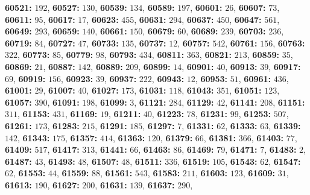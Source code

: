 \textsf{\bfseries 60521:} $192$, \textsf{\bfseries 60527:} $130$, \textsf{\bfseries 60539:} $134$, \textsf{\bfseries 60589:} $197$, \textsf{\bfseries 60601:} $26$, \textsf{\bfseries 60607:} $73$, \textsf{\bfseries 60611:} $95$, \textsf{\bfseries 60617:} $17$, \textsf{\bfseries 60623:} $455$, \textsf{\bfseries 60631:} $294$, \textsf{\bfseries 60637:} $450$, \textsf{\bfseries 60647:} $561$, \textsf{\bfseries 60649:} $293$, \textsf{\bfseries 60659:} $140$, \textsf{\bfseries 60661:} $150$, \textsf{\bfseries 60679:} $60$, \textsf{\bfseries 60689:} $239$, \textsf{\bfseries 60703:} $236$, \textsf{\bfseries 60719:} $84$, \textsf{\bfseries 60727:} $47$, \textsf{\bfseries 60733:} $135$, \textsf{\bfseries 60737:} $12$, \textsf{\bfseries 60757:} $542$, \textsf{\bfseries 60761:} $156$, \textsf{\bfseries 60763:} $322$, \textsf{\bfseries 60773:} $85$, \textsf{\bfseries 60779:} $98$, \textsf{\bfseries 60793:} $434$, \textsf{\bfseries 60811:} $363$, \textsf{\bfseries 60821:} $213$, \textsf{\bfseries 60859:} $35$, \textsf{\bfseries 60869:} $21$, \textsf{\bfseries 60887:} $142$, \textsf{\bfseries 60889:} $209$, \textsf{\bfseries 60899:} $14$, \textsf{\bfseries 60901:} $40$, \textsf{\bfseries 60913:} $39$, \textsf{\bfseries 60917:} $69$, \textsf{\bfseries 60919:} $156$, \textsf{\bfseries 60923:} $39$, \textsf{\bfseries 60937:} $222$, \textsf{\bfseries 60943:} $12$, \textsf{\bfseries 60953:} $51$, \textsf{\bfseries 60961:} $436$, \textsf{\bfseries 61001:} $29$, \textsf{\bfseries 61007:} $40$, \textsf{\bfseries 61027:} $173$, \textsf{\bfseries 61031:} $118$, \textsf{\bfseries 61043:} $351$, \textsf{\bfseries 61051:} $123$, \textsf{\bfseries 61057:} $390$, \textsf{\bfseries 61091:} $198$, \textsf{\bfseries 61099:} $3$, \textsf{\bfseries 61121:} $284$, \textsf{\bfseries 61129:} $42$, \textsf{\bfseries 61141:} $208$, \textsf{\bfseries 61151:} $311$, \textsf{\bfseries 61153:} $431$, \textsf{\bfseries 61169:} $19$, \textsf{\bfseries 61211:} $40$, \textsf{\bfseries 61223:} $78$, \textsf{\bfseries 61231:} $99$, \textsf{\bfseries 61253:} $507$, \textsf{\bfseries 61261:} $173$, \textsf{\bfseries 61283:} $215$, \textsf{\bfseries 61291:} $185$, \textsf{\bfseries 61297:} $7$, \textsf{\bfseries 61331:} $62$, \textsf{\bfseries 61333:} $63$, \textsf{\bfseries 61339:} $142$, \textsf{\bfseries 61343:} $175$, \textsf{\bfseries 61357:} $414$, \textsf{\bfseries 61363:} $120$, \textsf{\bfseries 61379:} $66$, \textsf{\bfseries 61381:} $366$, \textsf{\bfseries 61403:} $77$, \textsf{\bfseries 61409:} $517$, \textsf{\bfseries 61417:} $313$, \textsf{\bfseries 61441:} $66$, \textsf{\bfseries 61463:} $86$, \textsf{\bfseries 61469:} $79$, \textsf{\bfseries 61471:} $7$, \textsf{\bfseries 61483:} $2$, \textsf{\bfseries 61487:} $43$, \textsf{\bfseries 61493:} $48$, \textsf{\bfseries 61507:} $48$, \textsf{\bfseries 61511:} $336$, \textsf{\bfseries 61519:} $105$, \textsf{\bfseries 61543:} $62$, \textsf{\bfseries 61547:} $62$, \textsf{\bfseries 61553:} $44$, \textsf{\bfseries 61559:} $88$, \textsf{\bfseries 61561:} $543$, \textsf{\bfseries 61583:} $211$, \textsf{\bfseries 61603:} $123$, \textsf{\bfseries 61609:} $31$, \textsf{\bfseries 61613:} $190$, \textsf{\bfseries 61627:} $200$, \textsf{\bfseries 61631:} $139$, \textsf{\bfseries 61637:} $290$, 
